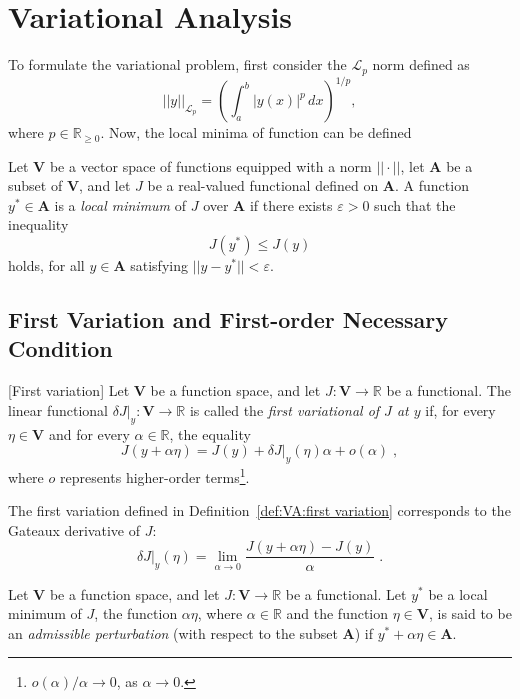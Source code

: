 
\chapter{Variational Analysis}\label{sec:VA}

To formulate the variational problem, first consider the $\mathcal{L}_p$
norm defined as
\begin{equation}\label{eq:lp norm}
	||y||_{\mathcal{L}_p}=\left(\int_a^b |y(x)|^p\,dx\right)^{1/p},
\end{equation}
where $p\in\mathbb{R}_{\geq0}$. Now, the local minima of function can be
defined

\begin{definition}\label{def:VA:local minima}
	Let $\mathbf{V}$ be a vector space of functions equipped with a norm 
	$||\cdot||$, let $\mathbf{A}$ be a subset of $\mathbf{V}$, and let 
	$J$ be a real-valued functional defined on $\mathbf{A}$. A function 
	$y^\ast\in \mathbf{A}$ is a \emph{local minimum} of $J$ over 
	$\mathbf{A}$ if there exists $\varepsilon>0$ such that the inequality
	$$J(y^\ast)\leq J(y)$$
	holds, for all $y\in \mathbf{A}$ satisfying $||y-y^\ast||<\varepsilon$.
\end{definition}

\section{First Variation and First-order Necessary Condition}

\begin{definition}\label{def:VA:first variation}[First variation]
	Let $\mathbf{V}$ be a function space, and let 
	$J:\mathbf{V}\to\mathbb{R}$ be a functional. The linear functional
	$\delta J|_y:\mathbf{V}\to\mathbb{R}$ is called the \emph{first 
	variational of $J$ at $y$} if, for every $\eta\in\mathbf{V}$ and for
	every $\alpha\in\mathbb{R}$, the equality
	\begin{equation}
		J(y+\alpha\eta) = J(y) + \delta J|_y(\eta)\alpha + o(\alpha)\;,
	\end{equation}
	where $o$ represents higher-order terms\footnote{$o(\alpha)/\alpha\to0$, 
	as $\alpha\to0$.}.
\end{definition}

The first variation defined in Definition~\ref{def:VA:first variation} 
corresponds to the Gateaux derivative of $J$:
\[\delta J|_y(\eta)=\lim_{\alpha\to0}\dfrac{J(y+\alpha\eta)-J(y)}{\alpha}\;.\]

\begin{definition}
	Let $\mathbf{V}$ be a function space, and let 
	$J:\mathbf{V}\to\mathbb{R}$ be a functional. Let $y^\ast$ be a local
	minimum of $J$, the function $\alpha\eta$, where $\alpha\in\mathbb{R}$
	and the function $\eta\in\mathbf{V}$, is said to be an 
	\emph{admissible perturbation} (with respect to the subset 
	$\mathbf{A}$) if $y^\ast+\alpha\eta\in\mathbf{A}$.
\end{definition}
